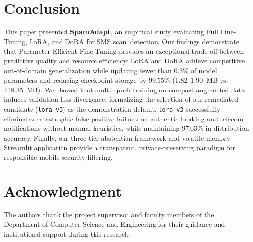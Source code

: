 \documentclass[conference]{IEEEtran}
\begin{document}
\section{Conclusion}
\label{sec:conclusion}

This paper presented \textbf{SpamAdapt}, an empirical study evaluating Full Fine-Tuning, LoRA, and DoRA for SMS scam detection. Our findings demonstrate that Parameter-Efficient Fine-Tuning provides an exceptional trade-off between predictive quality and resource efficiency: LoRA and DoRA achieve competitive out-of-domain generalization while updating fewer than 0.3\% of model parameters and reducing checkpoint storage by 99.55\% (1.82--1.90~MB vs. 418.35~MB). We showed that multi-epoch training on compact augmented data induces validation loss divergence, formalizing the selection of our remediated candidate (\texttt{lora\_v3}) as the demonstration default. \texttt{lora\_v3} successfully eliminates catastrophic false-positive failures on authentic banking and telecom notifications without manual heuristics, while maintaining 97.03\% in-distribution accuracy. Finally, our three-tier abstention framework and volatile-memory Streamlit application provide a transparent, privacy-preserving paradigm for responsible mobile security filtering.

\section*{Acknowledgment}
The authors thank the project supervisor and faculty members of the Department of Computer Science and Engineering for their guidance and institutional support during this research.
\end{document}
